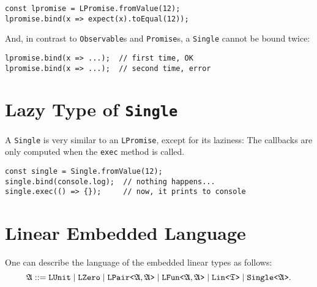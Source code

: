 \begin{verbatim}
const lpromise = LPromise.fromValue(12);
lpromise.bind(x => expect(x).toEqual(12));
\end{verbatim}

And, in contrast to \texttt{Observable}s and \texttt{Promise}s, a \texttt{Single} cannot be bound twice:

\begin{verbatim}
lpromise.bind(x => ...);  // first time, OK
lpromise.bind(x => ...);  // second time, error
\end{verbatim}

\section{Lazy Type of \texttt{Single}}

A \texttt{Single} is very similar to an \texttt{LPromise}, except for its laziness: The callbacks are only computed when the \texttt{exec} method is called.

\begin{verbatim}
const single = Single.fromValue(12);
single.bind(console.log);  // nothing happens...
single.exec(() => {});     // now, it prints to console
\end{verbatim}

\section{Linear Embedded Language}
One can describe the language of the embedded linear types as follows:
\[
\mathfrak{A} ::= \mathtt{LUnit} \mid \mathtt{LZero} \mid \mbox{\texttt{LPair<}}\mathfrak{A}, \mathfrak{A}\mbox{\texttt{>}} \mid \mbox{\texttt{LFun<}}\mathfrak{A}, \mathfrak{A}\mbox{\texttt{>}} \mid \mbox{\texttt{Lin<}}\mathfrak{T}\mbox{\texttt{>}} \mid \mbox{\texttt{Single<}}\mathfrak{A}\mbox{\texttt{>}}.
\]